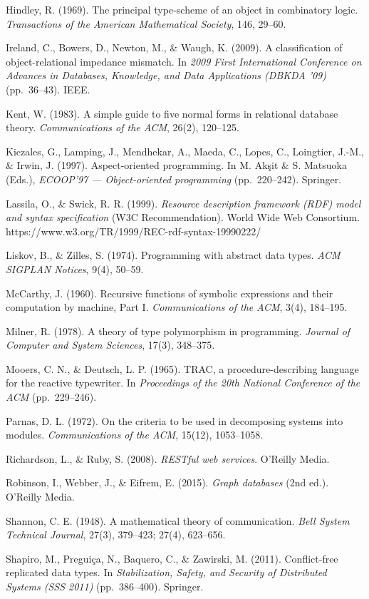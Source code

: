 \documentclass[
]{article}
\begin{document}
Hindley, R. (1969). The principal type-scheme of an object in
combinatory logic. \emph{Transactions of the American Mathematical
Society}, 146, 29--60.

Ireland, C., Bowers, D., Newton, M., \& Waugh, K. (2009). A
classification of object-relational impedance mismatch. In \emph{2009
First International Conference on Advances in Databases, Knowledge, and
Data Applications (DBKDA '09)} (pp.~36--43). IEEE.

Kent, W. (1983). A simple guide to five normal forms in relational
database theory. \emph{Communications of the ACM}, 26(2), 120--125.

Kiczales, G., Lamping, J., Mendhekar, A., Maeda, C., Lopes, C.,
Loingtier, J.-M., \& Irwin, J. (1997). Aspect-oriented programming. In
M. Akşit \& S. Matsuoka (Eds.), \emph{ECOOP'97 --- Object-oriented
programming} (pp.~220--242). Springer.

Lassila, O., \& Swick, R. R. (1999). \emph{Resource description
framework (RDF) model and syntax specification} (W3C Recommendation).
World Wide Web Consortium.
https://www.w3.org/TR/1999/REC-rdf-syntax-19990222/

Liskov, B., \& Zilles, S. (1974). Programming with abstract data types.
\emph{ACM SIGPLAN Notices}, 9(4), 50--59.

McCarthy, J. (1960). Recursive functions of symbolic expressions and
their computation by machine, Part I. \emph{Communications of the ACM},
3(4), 184--195.

Milner, R. (1978). A theory of type polymorphism in programming.
\emph{Journal of Computer and System Sciences}, 17(3), 348--375.

Mooers, C. N., \& Deutsch, L. P. (1965). TRAC, a procedure-describing
language for the reactive typewriter. In \emph{Proceedings of the 20th
National Conference of the ACM} (pp.~229--246).

Parnas, D. L. (1972). On the criteria to be used in decomposing systems
into modules. \emph{Communications of the ACM}, 15(12), 1053--1058.

Richardson, L., \& Ruby, S. (2008). \emph{RESTful web services}.
O'Reilly Media.

Robinson, I., Webber, J., \& Eifrem, E. (2015). \emph{Graph databases}
(2nd ed.). O'Reilly Media.

Shannon, C. E. (1948). A mathematical theory of communication.
\emph{Bell System Technical Journal}, 27(3), 379--423; 27(4), 623--656.

Shapiro, M., Preguiça, N., Baquero, C., \& Zawirski, M. (2011).
Conflict-free replicated data types. In \emph{Stabilization, Safety, and
Security of Distributed Systems (SSS 2011)} (pp.~386--400). Springer.
\end{document}
